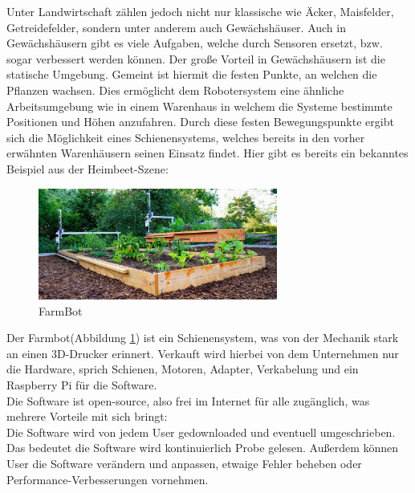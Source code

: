 Unter Landwirtschaft zählen jedoch nicht nur klassische wie Äcker, Maisfelder, Getreidefelder, sondern unter anderem auch Gewächshäuser.
Auch in Gewächshäusern gibt es viele Aufgaben, welche durch Sensoren ersetzt, bzw. sogar verbessert werden können.
Der große Vorteil in Gewächshäusern ist die statische Umgebung.
Gemeint ist hiermit die festen Punkte, an welchen die Pflanzen wachsen. 
Dies ermöglicht dem Robotersystem eine ähnliche Arbeitsumgebung wie in einem Warenhaus in welchem die Systeme bestimmte Positionen und Höhen anzufahren.
Durch diese festen Bewegungspunkte ergibt sich die Möglichkeit eines Schienensystems, welches bereits in den vorher erwähnten Warenhäusern seinen Einsatz findet.
Hier gibt es bereits ein bekanntes Beispiel aus der Heimbeet-Szene:\\

\begin{figure}[ht]
	\centering
	\includegraphics[width=0.7\textwidth]{bilder/farmbot.png}
	\caption[FarmBot]{FarmBot \cite{farmBotExpress}}
	\label{fig:farmbot}
\end{figure}

Der Farmbot(Abbildung \ref{fig:farmbot}) ist ein Schienensystem, was von der Mechanik stark an einen 3D-Drucker erinnert.
Verkauft wird hierbei von dem Unternehmen nur die Hardware, sprich Schienen, Motoren, Adapter, Verkabelung und ein Raspberry Pi für die Software.\\
Die Software ist open-source, also frei im Internet für alle zugänglich, was mehrere Vorteile mit sich bringt:\\
Die Software wird von jedem User gedownloaded und eventuell umgeschrieben. Das bedeutet die Software wird kontinuierlich Probe gelesen.
Außerdem können User die Software verändern und anpassen, etwaige Fehler beheben oder Performance-Verbesserungen vornehmen.